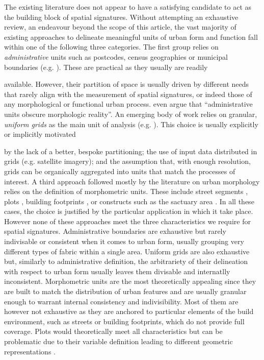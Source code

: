 The existing literature does not appear to have a satisfying candidate to act as
the building block of spatial signatures. 
%
Without attempting an exhaustive review, an endeavour beyond the scope of this
article, the vast majority of existing approaches to delineate meaningful units
of urban form and function fall within one of the following three categories.
The first group relies on \textit{administrative} units such as postcodes,
census geographies or municipal boundaries (e.g. \citealp{taubenbock2020}).
%
These are practical as they usually are readily

available. However, their partition of space is usually driven by different
needs that rarely align with the measurement of spatial signatures, or indeed
those of any morphological or functional urban process.
\cite{taubenbock2019new} even argue that
``administrative units obscure morphologic reality''.
An emerging body of work relies on granular, \textit{uniform grids} as the main
unit of analysis (e.g. \citealp{jochem2020}). This choice is usually explicitly or implicitly motivated

by the lack of a better, bespoke partitioning; the use of input data distributed
in grids (e.g. satellite imagery); and the assumption that, with enough
resolution, grids can be organically aggregated into units that match the
processes of interest.
A third approach followed mostly by the literature on urban morphology relies on
the definition of morphometric units. These include street segments
\citep{araldi2019}, plots \citep{bobkova2019}, building footprints
\citep{schirmer2015}, or constructs such as the sactuary area
\citep{mehaffy2010urban,dibble2019origin}.
In all these cases, the
choice is justified by the particular application in which it take place.
However none of these approaches meet the three characteristics we require for
spatial signatures.
%
Administrative boundaries are exhaustive but rarely indivisable or consistent
when it comes to urban form, usually grouping very different types of fabric
within a single area.
%
Uniform grids are also exhaustive but, similarly to administrative definition,
the arbitrariety of their delineation with respect to urban form usually leaves
them divisable and internatlly inconsistent.
%
Morphometric units are the most theoretically appealing since they are built to
match the distribution of urban features and are usually granular enough to
warrant internal consistency and indivisibility. Most of them are however not
exhaustive as they are anchored to particular elements of the build environment,
such as streets or building footprints, which do not provide full coverage.
Plots would theoretically meet all characteristics but can be problematic due to
their variable definition leading to different geometric representations
\citep{kropf2018plots}.

